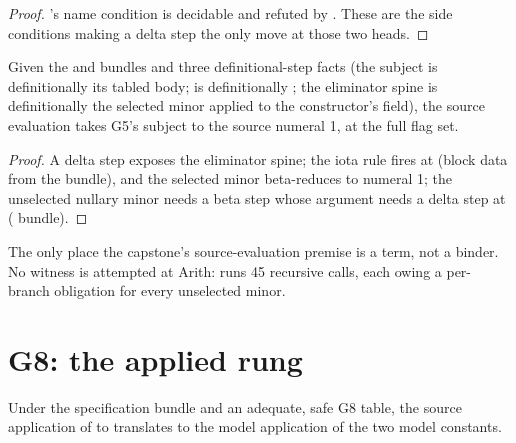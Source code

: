 \begin{proof} \leanok
{}
 's name condition is decidable and refuted by . These are
the side conditions making a delta step the only move at those two heads.
\end{proof}

\begin{proposition}\label{prop:Green-g5_seval}
 \leanok
{}
Given the  and  bundles and three definitional-step facts (the subject is
definitionally its tabled body;  is definitionally ; the eliminator
spine is definitionally the selected minor applied to the constructor's field), the source evaluation
takes G5's subject to the source numeral 1, at the full flag set.
\end{proposition}

\begin{proof} \leanok
{}
 A delta step exposes the eliminator spine; the iota rule fires at 
(block data from the  bundle), and the selected minor beta-reduces to numeral 1; the
unselected nullary minor needs a beta step whose argument needs a delta step at 
( bundle).
\end{proof}

\begin{remark}
 The only place the capstone's source-evaluation premise is a term, not a binder. No
witness is attempted at Arith:  runs 45 recursive calls, each owing a per-branch
obligation for every unselected minor.
\end{remark}

\section{G8: the applied rung}
\label{sec:capstone:g8}

\begin{lemma}\label{lem:Green-g8_trExprS_spine}
 \leanok
{}
Under the specification bundle and an adequate, safe G8 table, the source application of
 to  translates to the model application of the two model constants.
\end{lemma}

